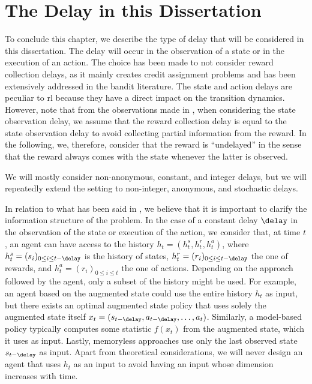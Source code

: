 
\section{The Delay in this Dissertation}
\label{subsec:delay_in_this_thesis}

To conclude this chapter, we describe the type of delay that will be considered in this dissertation.
The delay will occur in the observation of a state or in the execution of an action. 
The choice has been made to not consider reward collection delays, as it mainly creates credit assignment problems and has been extensively addressed in the bandit literature. 
The state and action delays are peculiar to \gls{rl} because they have a direct impact on the transition dynamics. 
However, note that from the observations made in , when considering the state observation delay, we assume that the reward collection delay is equal to the state observation delay to avoid collecting partial information from the reward.
In the following, we, therefore, consider that the reward is ``undelayed'' in the sense that the reward always comes with the state whenever the latter is observed. 

We will mostly consider non-anonymous, constant, and integer delays, but we will repeatedly extend the setting to non-integer, anonymous, and stochastic delays.

In relation to what has been said in , we believe that it is important to clarify the information structure of the problem. 
In the case of a constant delay $\delay$ in the observation of the state or execution of the action, we consider that, at time $t$, an agent can have access to the history $h_t = (h^s_t,h^r_t,h^a_t)$, where $h^s_t = (s_i)_{0\le i\le t-\delay}$ is the history of states, $h^r_t = (r_i)_{0\le i\le t-\delay}$ the one of rewards, and $h^a_t = (r_i)_{0\le i\le t}$ the one of actions. 
Depending on the approach followed by the agent, only a subset of the history might be used.
For example, an agent based on the augmented state could use the entire history $h_t$ as input, but there exists an optimal augmented state policy that uses solely the augmented state itself $x_t=(s_{t-\delay},a_{t-\delay},\dots,a_t)$.
Similarly, a model-based policy typically computes some statistic $f(x_t)$ from the augmented state, which it uses as input. 
Lastly, memoryless approaches use only the last observed state $s_{t-\delay}$ as input. 
Apart from theoretical considerations, we will never design an agent that uses $h_t$ as an input to avoid having an input whose dimension increases with time.